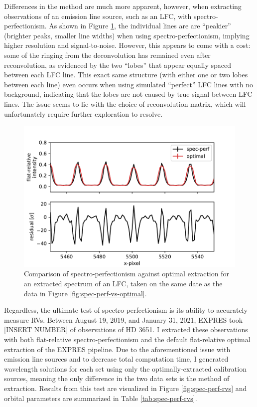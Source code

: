 Differences in the method are much more apparent, however, when extracting observations of an emission line source, such as an LFC, with spectro-perfectionism. As shown in Figure \ref{fig:spec-perf-vs-optimal-lfc}, the individual lines are are ``peakier'' (brighter peaks, smaller line widths) when using spectro-perfectionism, implying higher resolution and signal-to-noise. However, this appears to come with a cost: some of the ringing from the deconvolution has remained even after reconvolution, as evidenced by the two ``lobes'' that appear equally spaced between each LFC line. This exact same structure (with either one or two lobes between each line) even occurs when using simulated ``perfect'' LFC lines with no background, indicating that the lobes are not caused by true signal between LFC lines. The issue seems to lie with the choice of reconvolution matrix, which will unfortunately require further exploration to resolve.

\begin{figure}
    \centering
    \includegraphics{figures-5/spec-perf-vs-optimal-lfc.pdf}
    \caption{Comparison of spectro-perfectionism against optimal extraction for an extracted spectrum of an LFC, taken on the same date as the data in Figure \ref{fig:spec-perf-vs-optimal}.}
    \label{fig:spec-perf-vs-optimal-lfc}
\end{figure}

Regardless, the ultimate test of spectro-perfectionism is its ability to accurately measure RVs. Between August 19, 2019, and January 31, 2021, EXPRES took [INSERT NUMBER] of observations of HD 3651. I extracted these observations with both flat-relative spectro-perfectionism and the default flat-relative optimal extraction of the EXPRES pipeline. Due to the aforementioned issue with emission line sources and to decrease total computation time, I generated wavelength solutions for each set using only the optimally-extracted calibration sources, meaning the only difference in the two data sets is the method of extraction. Results from this test are visualized in Figure \ref{fig:spec-perf-rvs} and orbital parameters are summarized in Table \ref{tab:spec-perf-rvs}.



